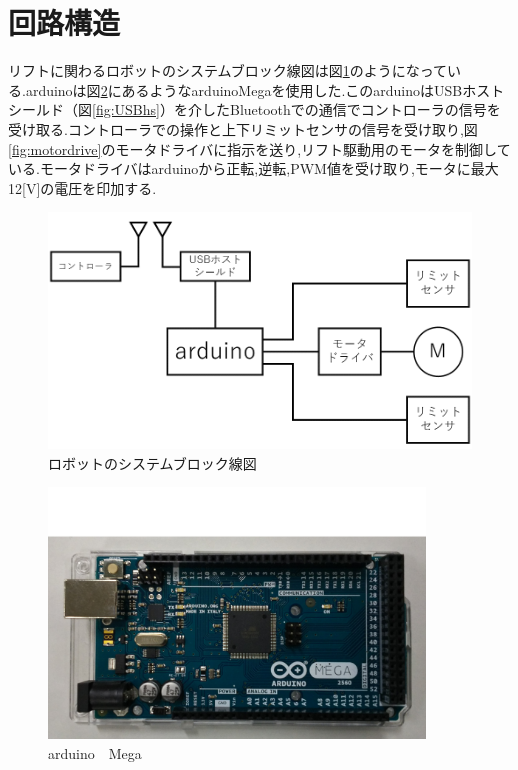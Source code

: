 \section{回路構造}
リフトに関わるロボットのシステムブロック線図は図\ref{fig:roboblock}のようになっている.arduinoは図\ref{fig:arduino}にあるようなarduinoMegaを使用した.このarduinoはUSBホストシールド（図\ref{fig:USBhs}）を介したBluetoothでの通信でコントローラの信号を受け取る.コントローラでの操作と上下リミットセンサの信号を受け取り,図\ref{fig:motordrive}のモータドライバに指示を送り,リフト駆動用のモータを制御している.モータドライバはarduinoから正転,逆転,PWM値を受け取り,モータに最大12[V]の電圧を印加する.

\begin{figure}[htbp]
  \begin{center}
    \includegraphics[width=120mm]{img/roboblock.png}
    \end{center}
  \caption{ロボットのシステムブロック線図}
 \label{fig:roboblock}
\end{figure}

\begin{figure}[htbp]
  \begin{center}
    \includegraphics[width=100mm]{img/arduinoMega.JPG}
    \end{center}
  \caption{arduino　Mega}
 \label{fig:arduino}
\end{figure}

